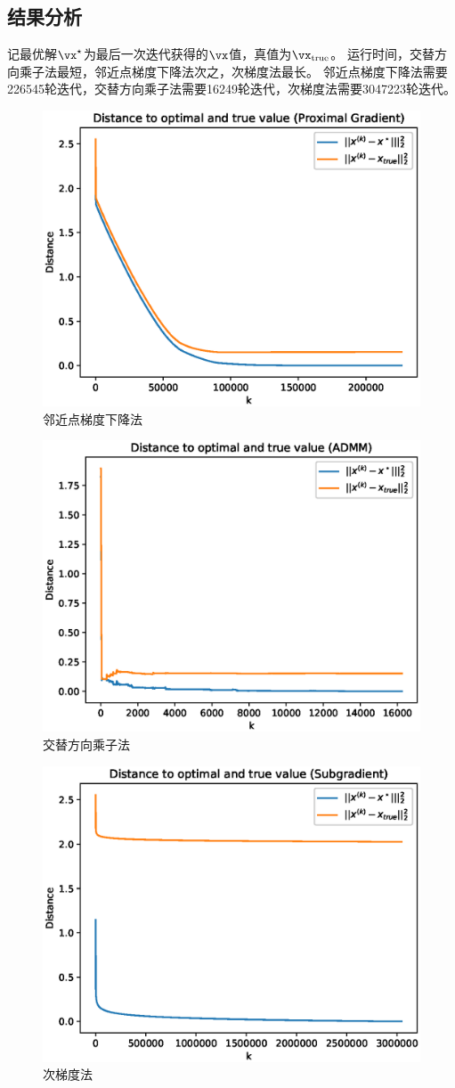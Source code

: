\documentclass[logo,reportComp]{thesis}
\begin{document}
\subsection{结果分析}
记最优解$\vx^\star$为最后一次迭代获得的$\vx$值，真值为$\vx_{\text{true}}$。
运行时间，交替方向乘子法最短，邻近点梯度下降法次之，次梯度法最长。
邻近点梯度下降法需要226545轮迭代，交替方向乘子法需要16249轮迭代，次梯度法需要3047223轮迭代。

\begin{figure}[H]
\centering
\includegraphics[width=0.6\linewidth]{fig/proxgrad.eps}
\caption{邻近点梯度下降法}
\label{fig:proxgrad}
\end{figure}
\begin{figure}[H]
\centering
\includegraphics[width=0.6\linewidth]{fig/admm.eps}
\caption{交替方向乘子法}
\label{fig:admm}
\end{figure}
\begin{figure}[H]
\centering
\includegraphics[width=0.6\linewidth]{fig/subgrad.eps}
\caption{次梯度法}
\label{fig:subgrad}
\end{figure}
\end{document}
